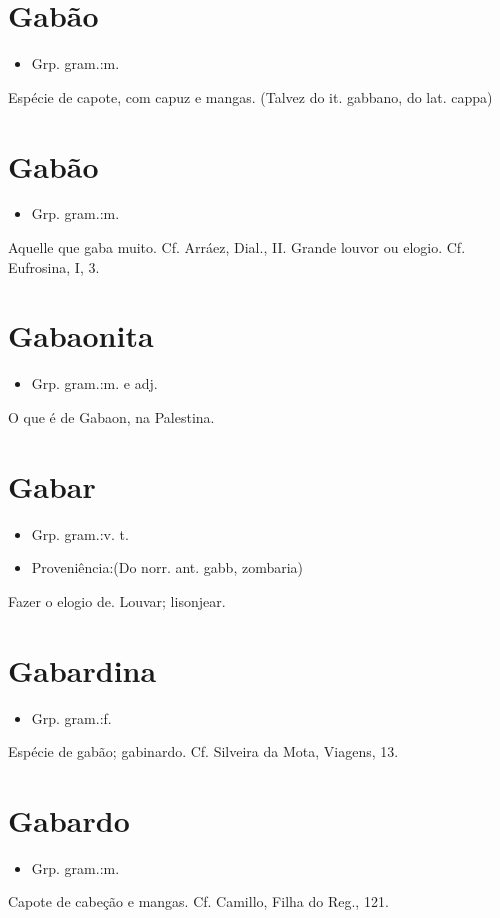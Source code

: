 \section{Gabão}
\begin{itemize}
\item {Grp. gram.:m.}
\end{itemize}
Espécie de capote, com capuz e mangas.
(Talvez do it. \textunderscore gabbano\textunderscore , do lat. \textunderscore cappa\textunderscore )
\section{Gabão}
\begin{itemize}
\item {Grp. gram.:m.}
\end{itemize}
Aquelle que gaba muito. Cf. Arráez, \textunderscore Dial.\textunderscore , II.
Grande louvor ou elogio. Cf. \textunderscore Eufrosina\textunderscore , I, 3.
\section{Gabaonita}
\begin{itemize}
\item {Grp. gram.:m.  e  adj.}
\end{itemize}
O que é de Gabaon, na Palestina.
\section{Gabar}
\begin{itemize}
\item {Grp. gram.:v. t.}
\end{itemize}
\begin{itemize}
\item {Proveniência:(Do norr. ant. \textunderscore gabb\textunderscore , zombaria)}
\end{itemize}
Fazer o elogio de.
Louvar; lisonjear.
\section{Gabardina}
\begin{itemize}
\item {Grp. gram.:f.}
\end{itemize}
Espécie de gabão; gabinardo. Cf. Silveira da Mota, \textunderscore Viagens\textunderscore , 13.
\section{Gabardo}
\begin{itemize}
\item {Grp. gram.:m.}
\end{itemize}
Capote de cabeção e mangas. Cf. Camillo, \textunderscore Filha do Reg.\textunderscore , 121.
